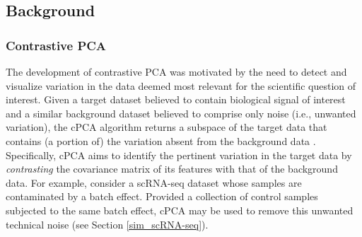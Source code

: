 \subsection{Background}\label{back}


\subsubsection{Contrastive PCA}\label{cpca}

The development of contrastive PCA was motivated by the need to detect and visualize variation in the data deemed most relevant for the scientific question of interest. Given a target dataset believed to contain biological signal of interest and a similar background dataset believed to comprise only noise (i.e., unwanted variation), the cPCA algorithm returns a subspace of the target data that contains (a portion of) the variation absent from the background data \citep{Abid2018}. Specifically, cPCA aims to identify the pertinent variation in the target data by \textit{contrasting} the covariance matrix of its features with that of the background data. For example, consider a scRNA-seq dataset whose samples are contaminated by a batch effect. Provided a collection of control samples subjected to the same batch effect, cPCA may be used to remove this unwanted technical noise (see Section \ref{sim_scRNA-seq}).

